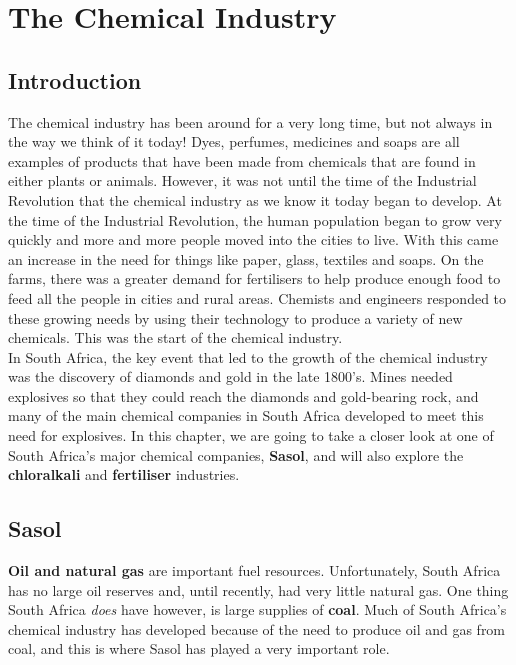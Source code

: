 \chapter{The Chemical Industry}
\label{chap:chemindustry}

\section{Introduction}
\label{sec:chem:intro}

The chemical industry has been around for a very long time, but not always in the way we think of it today! Dyes, perfumes, medicines and soaps are all examples of products that have been made from chemicals that are found in either plants or animals. However, it was not until the time of the Industrial Revolution that the chemical industry as we know it today began to develop. At the time of the Industrial Revolution, the human population began to grow very quickly and more and more people moved into the cities to live. With this came an increase in the need for things like paper, glass, textiles and soaps. On the farms, there was a greater demand for fertilisers to help produce enough food to feed all the people in cities and rural areas. Chemists and engineers responded to these growing needs by using their technology to produce a variety of new chemicals. This was the start of the chemical industry.\\

In South Africa, the key event that led to the growth of the chemical industry was the discovery of diamonds and gold in the late 1800's. Mines needed explosives so that they could reach the diamonds and gold-bearing rock, and many of the main chemical companies in South Africa developed to meet this need for explosives. In this chapter, we are going to take a closer look at one of South Africa's major chemical companies, \textbf{Sasol}, and will also explore the \textbf{chloralkali} and \textbf{fertiliser} industries. 
\section{Sasol}
\label{sec:chemindustry:Sasol}

\textbf{Oil and natural gas} are important fuel resources. Unfortunately, South Africa has no large oil reserves and, until recently, had very little natural gas. One thing South Africa \textit{does} have however, is large supplies of \textbf{coal}. Much of South Africa's chemical industry has developed because of the need to produce oil and gas from coal, and this is where Sasol has played a very important role.\\

